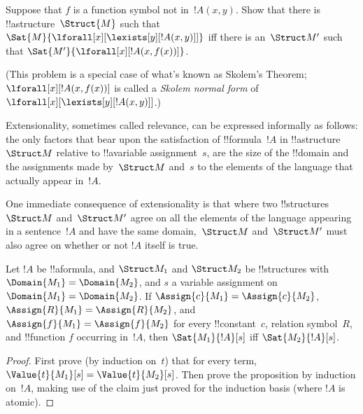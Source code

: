 \begin{prob}
Suppose that $f$ is a function symbol not in~$!A(x,y)$. Show that
there is !!a{structure}~$\Struct{M}$ such that
$\Sat{M}{\lforall[x][\lexists[y][!A(x,y)]]}$ iff there is an~$\Struct
M'$ such that $\Sat{M'}{\lforall[x][!A(x,f(x))]}$.

(This problem is a special case of what's known as Skolem's Theorem;
$\lforall[x][!A(x,f(x))]$ is called a \emph{Skolem normal form} of
$\lforall[x][\lexists[y][!A(x,y)]]$.)
\end{prob}







\begin{explain}
Extensionality, sometimes called relevance, can be expressed
informally as follows: the only factors that bear upon the
satisfaction of !!{formula}~$!A$ in !!a{structure}~$\Struct M$
relative to !!a{variable} assignment~$s$, are the size of the
!!{domain} and the assignments made by~$\Struct M$ and~$s$ to the
elements of the language that actually appear in~$!A$.

One immediate consequence of extensionality is that where two
!!{structure}s~$\Struct M$ and~$\Struct M'$ agree on all the elements
of the language appearing in a sentence~$!A$ and have the same
domain,~$\Struct M$ and~$\Struct M'$ must also agree on whether or not
$!A$ itself is true.
\end{explain}

\begin{prop}[Extensionality]
  Let $!A$ be !!a{formula}, and $\Struct M_1$ and $\Struct M_2$ be
  !!{structure}s with $\Domain{M_1} = \Domain{M_2}$, and $s$ a
  variable assignment on $\Domain{M_1} = \Domain{M_2}$.  If
  $\Assign{c}{M_1} = \Assign{c}{M_2}$, $\Assign{R}{M_1}=\Assign{R}{M_2}$,
  and $\Assign{f}{M_1} = \Assign{f}{M_2}$ for every !!{constant}~$c$,
  relation symbol~$R$, and !!{function} $f$ occurring in~$!A$, then
  $\Sat{M_1}{!A}[s]$ iff $\Sat{M_2}{!A}[s]$.
\end{prop}

\begin{proof}
  First prove (by induction on~$t$) that for every term,
  $\Value{t}{M_1}[s] = \Value{t}{M_2}[s]$.  Then prove the proposition
  by induction on~$!A$, making use of the claim just proved for the
  induction basis (where $!A$ is atomic).
\end{proof}

